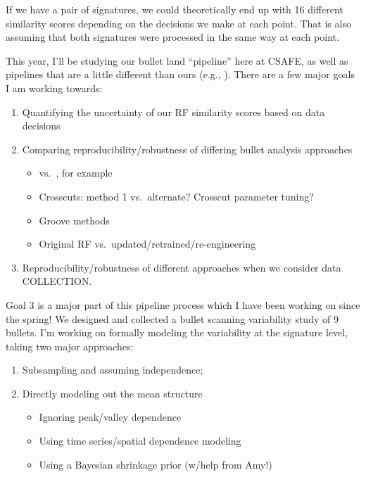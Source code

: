 \documentclass[]{book}
\providecommand{\tightlist}{%
  \setlength{\itemsep}{0pt}\setlength{\parskip}{0pt}}
\begin{document}
If we have a pair of signatures, we could theoretically end up with 16 different similarity scores depending on the decisions we make at each point. That is also assuming that both signatures were processed in the same way at each point.

This year, I'll be studying our bullet land ``pipeline'' here at CSAFE, as well as pipelines that are a little different than ours (e.g., \citet{chu_jfs}). There are a few major goals I am working towards:

\begin{enumerate}
\def\labelenumi{\arabic{enumi}.}
\tightlist
\item
  Quantifying the uncertainty of our RF similarity scores based on data decisions\\
\item
  Comparing reproducibility/robustness of differing bullet analysis approaches

  \begin{itemize}
  \tightlist
  \item
    \citet{aoas} vs.~\citet{chu_jfs}, for example
  \item
    Crosscuts: method 1 vs.~alternate? Crosscut parameter tuning?
  \item
    Groove methods\\
  \item
    Original RF vs.~updated/retrained/re-engineering
  \end{itemize}
\item
  Reproducibility/robustness of different approaches when we consider data COLLECTION.
\end{enumerate}

Goal 3 is a major part of this pipeline process which I have been working on since the spring! We designed and collected a bullet scanning variability study of 9 bullets. I'm working on formally modeling the variability at the signature level, taking two major approaches:

\begin{enumerate}
\def\labelenumi{\arabic{enumi}.}
\tightlist
\item
  Subsampling and assuming independence;
\item
  Directly modeling out the mean structure

  \begin{itemize}
  \tightlist
  \item
    Ignoring peak/valley dependence
  \item
    Using time series/spatial dependence modeling
  \item
    Using a Bayesian shrinkage prior (w/help from Amy!)
  \end{itemize}
\end{enumerate}
\end{document}
